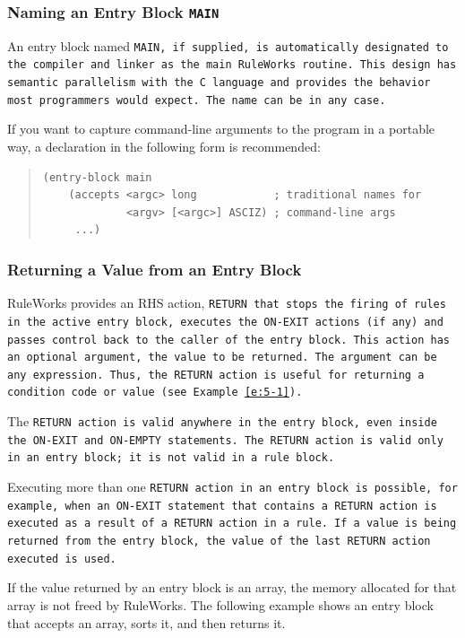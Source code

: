\subsubsection{Naming an Entry Block \tt{MAIN}}

An entry block named \tt{MAIN}, if supplied, is automatically
designated to the compiler and linker as the main RuleWorks
routine. This design has semantic parallelism with the C language and
provides the behavior most programmers would expect. The name can be
in any case.

If you want to capture command-line arguments to the program in a
portable way, a declaration in the following form is recommended:
\begin{quote}
\begin{verbatim}
(entry-block main
    (accepts <argc> long            ; traditional names for
             <argv> [<argc>] ASCIZ) ; command-line args
     ...)
\end{verbatim}
\end{quote}

\subsubsection{Returning a Value from an Entry Block}

RuleWorks provides an RHS action, \tt{RETURN} that stops the firing of
rules in the active entry block, executes the \tt{ON-EXIT} actions (if
any) and passes control back to the caller of the entry block. This
action has an optional argument, the value to be returned. The
argument can be any expression. Thus, the \tt{RETURN} action is useful
for returning a condition code or value (see Example~\ref{e:5-1}).

The \tt{RETURN} action is valid anywhere in the entry block, even
inside the \tt{ON-EXIT} and \tt{ON-EMPTY} statements. The \tt{RETURN}
action is valid only in an entry block; it is not valid in a rule
block.

Executing more than one \tt{RETURN} action in an entry block is
possible, for example, when an \tt{ON-EXIT} statement that contains a
\tt{RETURN} action is executed as a result of a \tt{RETURN} action in
a rule. If a value is being returned from the entry block, the value
of the last \tt{RETURN} action executed is used.

If the value returned by an entry block is an array, the memory
allocated for that array is not freed by RuleWorks. The following
example shows an entry block that accepts an array, sorts it, and then
returns it.

